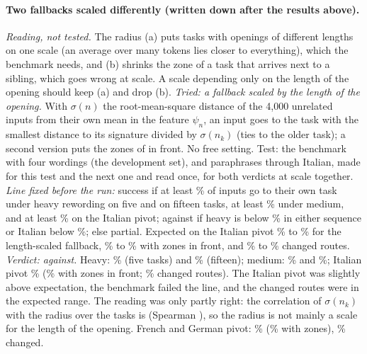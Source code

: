 \paragraph{Two fallbacks scaled differently (written down after the results above).} \emph{Reading, not tested.} The radius (a) puts tasks with openings of different lengths on one scale (an average over many tokens lies closer to everything), which the benchmark needs, and (b) shrinks the zone of a task that arrives next to a sibling, which goes wrong at scale. A scale depending only on the length of the opening should keep (a) and drop (b).
\emph{Tried: a fallback scaled by the length of the opening.} With $\sigma(n)$ the root-mean-square distance of the 4{,}000 unrelated inputs from their own mean in the feature $\psi_n$, an input goes to the task with the smallest distance to its signature divided by $\sigma(n_k)$ (ties to the older task); a second version puts the zones of \cert{} in front. No free setting. Test: the benchmark with four wordings (the development set), and paraphrases through Italian, made for this test and the next one and read once, for both verdicts at scale together.
\emph{Line fixed before the run:} success if at least \RerouteLineHeavy{}\% of inputs go to their own task under heavy rewording on five and on fifteen tasks, at least \RerouteLineMedium{}\% under medium, and at least \RerouteLineItalian{}\% on the Italian pivot; against if heavy is below \RerouteLineHeavyAgainst{}\% in either sequence or Italian below \RerouteLineItalianAgainst{}\%; else partial. Expected on the Italian pivot \RerouteExpectNormItLow{}\% to \RerouteExpectNormItHigh{}\% for the length-scaled fallback, \RerouteExpectCfThreeItLow{}\% to \RerouteExpectCfThreeItHigh{}\% with zones in front, and \RerouteExpectNormChangedLow{}\% to \RerouteExpectNormChangedHigh{}\% changed routes.
\emph{Verdict: against.} Heavy: \RerouteNormHeavyFive{}\% (five tasks) and \RerouteNormHeavyFifteen{}\% (fifteen); medium: \RerouteNormMediumFive{}\% and \RerouteNormMediumFifteen{}\%; Italian pivot \RerouteNormItOwn{}\% (\RerouteCertThreeItOwn{}\% with zones in front; \RerouteNormItChanged{}\% changed routes). The Italian pivot was slightly above expectation, the benchmark failed the line, and the changed routes were in the expected range. The reading was only partly right: the correlation of $\sigma(n_k)$ with the radius over the \WidenTasksEval{} tasks is \RerouteSigmaCorr{} (Spearman \RerouteSigmaCorrSpearman{}), so the radius is not mainly a scale for the length of the opening. French and German pivot: \RerouteNormOwnEnd{}\% (\RerouteCertThreeOwnEnd{}\% with zones), \RerouteNormChanged{}\% changed.

